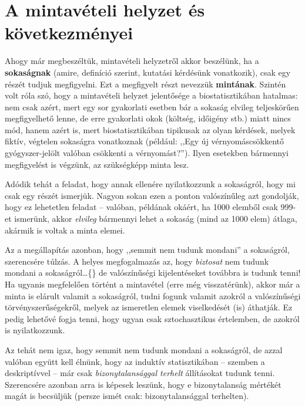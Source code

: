 \documentclass[
]{book}
\begin{document}
\hypertarget{induktivmintavetelihelyzet}{%
\section{A mintavételi helyzet és következményei}\label{induktivmintavetelihelyzet}}

Ahogy már megbeszéltük, mintavételi helyzetről akkor beszélünk, ha a \textbf{sokaságnak} (amire, definíció szerint, kutatási kérdésünk vonatkozik), csak egy részét tudjuk megfigyelni. Ezt a megfigyelt részt nevezzük \textbf{mintának}. Szintén volt róla szó, hogy a mintavételi helyzet jelentősége a biostatisztikában hatalmas: nem csak azért, mert egy sor gyakorlati esetben bár a sokaság elvileg teljeskörűen megfigyelhető lenne, de erre gyakorlati okok (költség, időigény stb.) miatt nincs mód, hanem azért is, mert biostatisztikában tipikusak az olyan kérdések, melyek fiktív, végtelen sokaságra vonatkoznak (például: ,,Egy új vérnyomáscsökkentő gyógyszer-jelölt valóban csökkenti a vérnyomást?''). Ilyen esetekben bármennyi megfigyelést is végzünk, az szükségképp minta lesz.

Adódik tehát a feladat, hogy annak ellenére nyilatkozzunk a sokaságról, hogy mi csak egy részét ismerjük. Nagyon sokan ezen a ponton valószínűleg azt gondolják, hogy ez lehetetlen feladat -- valóban, példának okáért, ha 1000 elemből csak 999-et ismerünk, akkor \emph{elvileg} bármennyi lehet a sokaság (mind az 1000 elem) átlaga, akármik is voltak a minta elemei.

Az a megállapítás azonban, hogy ,,semmit nem tudunk mondani'' a sokaságról, szerencsére túlzás. A helyes megfogalmazás az, hogy \emph{biztosat} nem tudunk mondani a sokaságról\dots\{\} de valószínűségi kijelentéseket továbbra is tudunk tenni! Ha ugyanis megfelelően történt a mintavétel (erre még visszatérünk), akkor már a minta is elárult valamit a sokaságról, tudni fogunk valamit azokról a valószínűségi törvényszerűségekről, melyek az ismeretlen elemek viselkedését (is) áthatják. Ez pedig lehetővé fogja tenni, hogy ugyan csak sztochasztikus értelemben, de azokról is nyilatkozzunk.

Az tehát nem igaz, hogy semmit nem tudunk mondani a sokaságról, de azzal valóban együtt kell élnünk, hogy az induktív statisztikában -- szemben a deskriptívvel -- már csak \emph{bizonytalansággal terhelt} állításokat tudunk tenni. Szerencsére azonban arra is képesek leszünk, hogy e bizonytalanság mértékét magát is becsüljük (persze ismét csak: bizonytalansággal terhelten).
\end{document}
